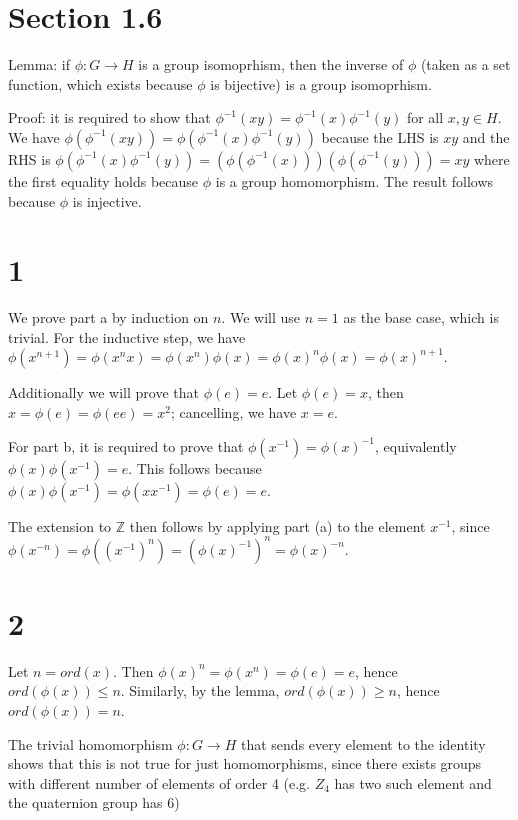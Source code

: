 \documentclass{article}
\def\Z{\mathbb{Z}}
\def\inv{{-1}}
\begin{document}
\section*{Section 1.6}

Lemma: if $\phi: G \to H$ is a group isomoprhism, then the inverse of $\phi$ (taken as a set function, which exists because $\phi$ is bijective) is a group isomoprhism.

Proof: it is required to show that $\phi^\inv(xy) = \phi^\inv(x)\phi^\inv(y)$ for all $x, y \in H$. We have $\phi(\phi^\inv(xy)) = \phi(\phi^\inv(x)\phi^\inv(y))$ because the LHS is $xy$ and the RHS is $\phi(\phi^\inv(x)\phi^\inv(y)) = (\phi(\phi^\inv(x))) (\phi(\phi^\inv(y))) = xy$ where the first equality holds because $\phi$ is a group homomorphism. The result follows because $\phi$ is injective.

\section*{1}

We prove part a by induction on $n$. We will use $n=1$ as the base case, which is trivial. For the inductive step, we have $\phi(x^{n+1}) = \phi(x^n x) = \phi(x^n) \phi(x) = \phi(x)^n \phi(x) = \phi(x)^{n+1}$.

Additionally we will prove that $\phi(e) = e$. Let $\phi(e) = x$, then $x = \phi(e) = \phi(ee) = x^2$; cancelling, we have $x = e$.

For part b, it is required to prove that $\phi(x^\inv) = \phi(x)^\inv$, equivalently $\phi(x) \phi(x^\inv) = e$. This follows because $\phi(x) \phi(x^\inv) = \phi(x x^\inv) = \phi(e) = e$.

The extension to $\Z$ then follows by applying part (a) to the element $x^\inv$, since $\phi(x^{-n}) = \phi((x^\inv)^n) = (\phi(x)^\inv)^n = \phi(x)^{-n}$.

\section*{2}

Let $n = ord(x)$. Then $\phi(x)^n = \phi(x^n) = \phi(e) = e$, hence $ord(\phi(x)) \le n$. Similarly, by the lemma, $ord(\phi(x)) \ge n$, hence $ord(\phi(x)) = n$.

The trivial homomorphism $\phi: G \to H$ that sends every element to the identity shows that this is not true for just homomorphisms, since there exists groups with different number of elements of order 4 (e.g. $Z_4$ has two such element and the quaternion group has 6)
\end{document}
